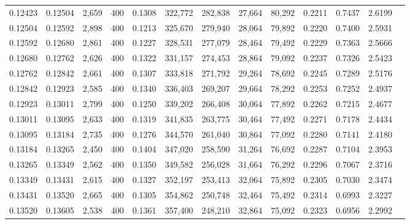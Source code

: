 \begin{tabular}{rrrrrrrrrrrrr}
0.12423 & 0.12504 &  2,659 & 400 &                                     0.1308 & 322,772 & 282,838 &  27,664 &  80,292 & 0.2211 & 0.7437 & 2.6199 \\
0.12504 & 0.12592 &  2,898 & 400 &                                     0.1213 & 325,670 & 279,940 &  28,064 &  79,892 & 0.2220 & 0.7400 & 2.5931 \\
0.12592 & 0.12680 &  2,861 & 400 &                                     0.1227 & 328,531 & 277,079 &  28,464 &  79,492 & 0.2229 & 0.7363 & 2.5666 \\
0.12680 & 0.12762 &  2,626 & 400 &                                     0.1322 & 331,157 & 274,453 &  28,864 &  79,092 & 0.2237 & 0.7326 & 2.5423 \\
0.12762 & 0.12842 &  2,661 & 400 &                                     0.1307 & 333,818 & 271,792 &  29,264 &  78,692 & 0.2245 & 0.7289 & 2.5176 \\
0.12842 & 0.12923 &  2,585 & 400 &                                     0.1340 & 336,403 & 269,207 &  29,664 &  78,292 & 0.2253 & 0.7252 & 2.4937 \\
0.12923 & 0.13011 &  2,799 & 400 &                                     0.1250 & 339,202 & 266,408 &  30,064 &  77,892 & 0.2262 & 0.7215 & 2.4677 \\
0.13011 & 0.13095 &  2,633 & 400 &                                     0.1319 & 341,835 & 263,775 &  30,464 &  77,492 & 0.2271 & 0.7178 & 2.4434 \\
0.13095 & 0.13184 &  2,735 & 400 &                                     0.1276 & 344,570 & 261,040 &  30,864 &  77,092 & 0.2280 & 0.7141 & 2.4180 \\
0.13184 & 0.13265 &  2,450 & 400 &                                     0.1404 & 347,020 & 258,590 &  31,264 &  76,692 & 0.2287 & 0.7104 & 2.3953 \\
0.13265 & 0.13349 &  2,562 & 400 &                                     0.1350 & 349,582 & 256,028 &  31,664 &  76,292 & 0.2296 & 0.7067 & 2.3716 \\
0.13349 & 0.13431 &  2,615 & 400 &                                     0.1327 & 352,197 & 253,413 &  32,064 &  75,892 & 0.2305 & 0.7030 & 2.3474 \\
0.13431 & 0.13520 &  2,665 & 400 &                                     0.1305 & 354,862 & 250,748 &  32,464 &  75,492 & 0.2314 & 0.6993 & 2.3227 \\
0.13520 & 0.13605 &  2,538 & 400 &                                     0.1361 & 357,400 & 248,210 &  32,864 &  75,092 & 0.2323 & 0.6956 & 2.2992 \\

\end{tabular}

